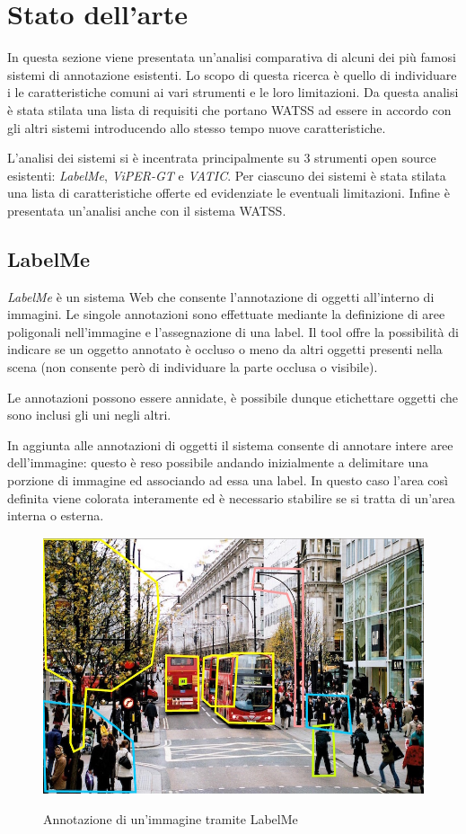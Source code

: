 \section{Stato dell'arte}
\label{ch:panoramica}

In questa sezione viene presentata un'analisi comparativa di alcuni dei più famosi sistemi di annotazione esistenti. Lo scopo di questa ricerca è quello di individuare i le caratteristiche comuni ai vari strumenti e le loro limitazioni. Da questa analisi è stata stilata una lista di requisiti che portano WATSS ad essere in accordo con gli altri sistemi introducendo allo stesso tempo nuove caratteristiche.

L'analisi dei sistemi si è incentrata principalmente su 3 strumenti open source esistenti: \emph{LabelMe}, \emph{ViPER-GT} e \emph{VATIC}. Per ciascuno dei sistemi è stata stilata una lista di caratteristiche offerte ed evidenziate le eventuali limitazioni. Infine è presentata un'analisi anche con il sistema WATSS.

\subsection{LabelMe}

\emph{LabelMe}\cite{Russell:2008:LDW:1345995.1345999} è un sistema Web che consente l'annotazione di oggetti all'interno di immagini. Le singole annotazioni sono effettuate mediante la definizione di aree poligonali nell'immagine e l'assegnazione di una label. Il tool offre la possibilità di indicare se un oggetto annotato è occluso o meno da altri oggetti presenti nella scena (non consente però di individuare la parte occlusa o visibile).

Le annotazioni possono essere annidate, è possibile dunque etichettare oggetti che sono inclusi gli uni negli altri. 

In aggiunta alle annotazioni di oggetti il sistema consente di annotare intere aree dell'immagine: questo è reso possibile andando inizialmente a delimitare una porzione di immagine ed associando ad essa una label. In questo caso l'area così definita viene colorata interamente ed è necessario stabilire se si tratta di un'area interna o esterna.

\begin{figure}[H]
\centering
\includegraphics[width=0.6\linewidth]{images/labelme.jpg}
  \label{fig:labelme}
  \caption{Annotazione di un'immagine tramite LabelMe}
\end{figure}

